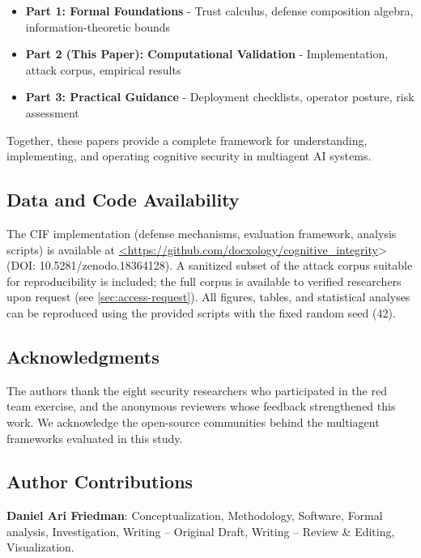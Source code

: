\documentclass[
]{article}
\providecommand{\tightlist}{%
  \setlength{\itemsep}{0pt}\setlength{\parskip}{0pt}}
\begin{document}
\begin{itemize}
\tightlist
\item
  \textbf{Part 1: Formal Foundations} - Trust calculus, defense
  composition algebra, information-theoretic bounds
\item
  \textbf{Part 2 (This Paper): Computational Validation} -
  Implementation, attack corpus, empirical results
\item
  \textbf{Part 3: Practical Guidance} - Deployment checklists, operator
  posture, risk assessment
\end{itemize}

Together, these papers provide a complete framework for understanding,
implementing, and operating cognitive security in multiagent AI systems.

\subsection{Data and Code
Availability}\label{data-and-code-availability}

The CIF implementation (defense mechanisms, evaluation framework,
analysis scripts) is available at
\url{<https://github.com/docxology/cognitive_integrity}\textgreater{}
(DOI: 10.5281/zenodo.18364128). A sanitized subset of the attack corpus
suitable for reproducibility is included; the full corpus is available
to verified researchers upon request (see \cref{sec:access-request}).
All figures, tables, and statistical analyses can be reproduced using
the provided scripts with the fixed random seed (42).

\subsection{Acknowledgments}\label{acknowledgments}

The authors thank the eight security researchers who participated in the
red team exercise, and the anonymous reviewers whose feedback
strengthened this work. We acknowledge the open-source communities
behind the multiagent frameworks evaluated in this study.

\subsection{Author Contributions}\label{author-contributions}

\textbf{Daniel Ari Friedman}: Conceptualization, Methodology, Software,
Formal analysis, Investigation, Writing -- Original Draft, Writing --
Review \& Editing, Visualization.
\end{document}
